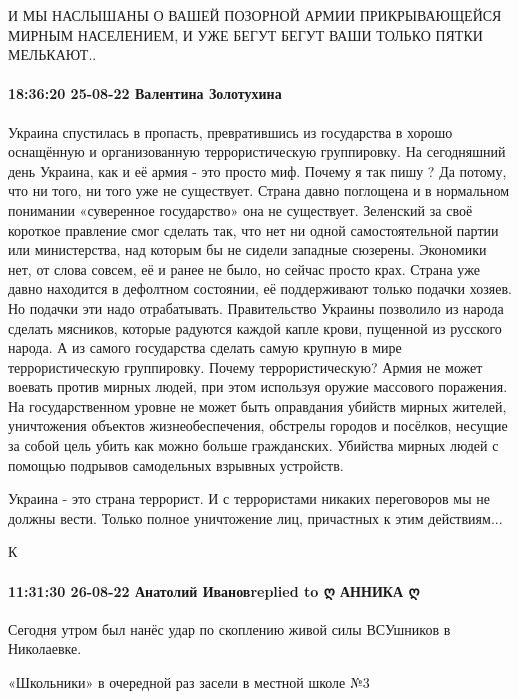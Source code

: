И МЫ НАСЛЫШАНЫ О ВАШЕЙ ПОЗОРНОЙ АРМИИ ПРИКРЫВАЮЩЕЙСЯ МИРНЫМ НАСЕЛЕНИЕМ, И УЖЕ
БЕГУТ БЕГУТ ВАШИ ТОЛЬКО ПЯТКИ МЕЛЬКАЮТ..


\paragraph{18:36:20 25-08-22 Валентина Золотухина}

Украина спустилась в пропасть, превратившись из государства в хорошо оснащённую
и организованную террористическую группировку. На сегодняшний день Украина, как
и её армия - это просто миф. Почему я так пишу ? Да потому, что ни того, ни
того уже не существует. Страна давно поглощена и в нормальном понимании
«суверенное государство» она не существует. Зеленский за своё короткое
правление смог сделать так, что нет ни одной самостоятельной партии или
министерства, над которым бы не сидели западные сюзерены. Экономики нет, от
слова совсем, её и ранее не было, но сейчас просто крах. Страна уже давно
находится в дефолтном состоянии, её поддерживают только подачки хозяев. Но
подачки эти надо отрабатывать. Правительство Украины позволило из народа
сделать мясников, которые радуются каждой капле крови, пущенной из русского
народа. А из самого государства сделать самую крупную в мире террористическую
группировку. Почему террористическую? Армия не может воевать против мирных
людей, при этом используя оружие массового поражения. На государственном уровне
не может быть оправдания убийств мирных жителей, уничтожения объектов
жизнеобеспечения, обстрелы городов и посёлков, несущие за собой цель убить как
можно больше гражданских. Убийства мирных людей с помощью подрывов самодельных
взрывных устройств.

Украина - это страна террорист. И с террористами никаких переговоров мы не
должны вести. Только полное уничтожение лиц, причастных к этим действиям...

К 

\paragraph{11:31:30 26-08-22 Анатолий Ивановreplied to ღ АННИКА ღ}

Сегодня утром был нанёс удар по скоплению живой силы ВСУшников в Николаевке.

«Школьники» в очередной раз засели в местной школе №3



